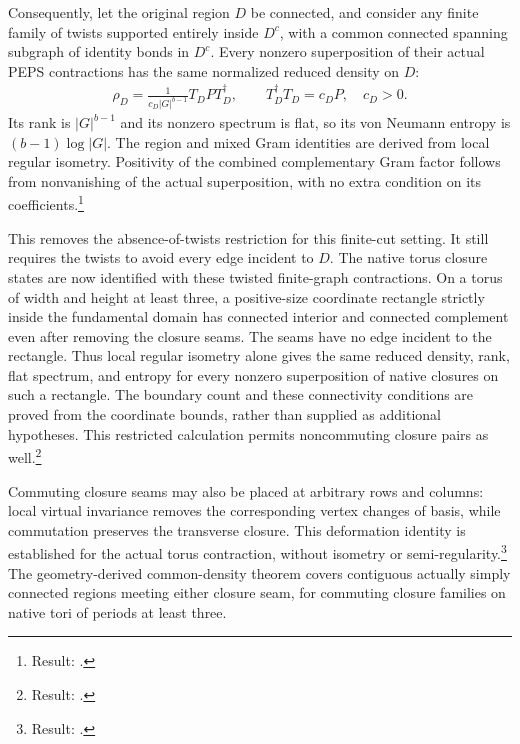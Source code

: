 \documentclass{article}
\begin{document}
Consequently, let the original region $D$ be connected, and consider
any finite family of twists supported entirely inside $D^c$, with a
common connected spanning subgraph of identity bonds in $D^c$.
Every nonzero superposition of their actual PEPS contractions has the
same normalized reduced density on $D$:
\begin{align}
    \rho_D=\frac{1}{c_D|G|^{b-1}}T_DPT_D^\dagger,
    \qquad T_D^\dagger T_D=c_DP,\quad c_D>0.
    \label{eq:rmp_peps_qd_common_density}
\end{align}
Its rank is $|G|^{b-1}$ and its nonzero spectrum is flat, so its
von Neumann entropy is $(b-1)\log|G|$. The region and mixed Gram
identities are derived from local regular isometry. Positivity of the
combined complementary Gram factor follows from nonvanishing of the
actual superposition, with no extra condition on its
coefficients.\footnote{Result:
    .}

This removes the absence-of-twists restriction for this finite-cut
setting. It still requires the twists to avoid every edge incident to
$D$. The native torus closure states are now identified with these
twisted finite-graph contractions. On a torus of width and height at
least three, a positive-size coordinate rectangle strictly inside the
fundamental domain has connected interior and connected complement
even after removing the closure seams. The seams have no edge incident
to the rectangle. Thus local regular isometry alone gives the same
reduced density, rank, flat spectrum, and entropy for every nonzero
superposition of native closures on such a rectangle. The boundary
count and these connectivity conditions are proved from the coordinate
bounds, rather than supplied as additional hypotheses. This restricted
calculation permits noncommuting closure pairs as well.\footnote{Result:
    .}

Commuting closure seams may also be placed at arbitrary rows and columns:
local virtual invariance removes the corresponding vertex changes of
basis, while commutation preserves the transverse closure. This deformation
identity is established for the actual torus contraction, without
isometry or semi-regularity.\footnote{Result:
    .}
The geometry-derived common-density theorem covers contiguous actually
simply connected regions meeting either closure seam, for commuting
closure families on native tori of periods at least three.
\end{document}
